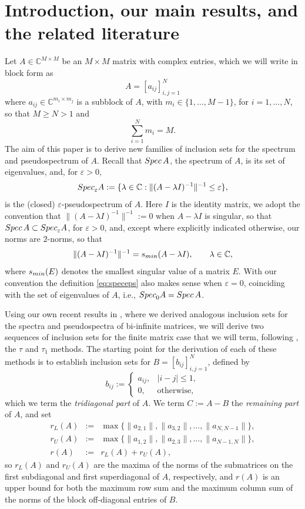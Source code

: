 \documentclass[preprint,1p,11pt]{elsarticle}
\newcommand\C{{\mathbb C}}
\newcommand\eps{{\varepsilon}}
\newcommand\Spec{{\rm Spec}\,}  %
\newcommand\Specn{{\rm Spec}}   %
\newcommand\Speps{{\rm Spec}_\eps}
\numberwithin{equation}{section}   %
\numberwithin{figure}{section}  %
\begin{document}
\section{Introduction, our main results, and the related literature} \label{sec:intro}
Let $A\in \C^{M\times M}$ be an $M\times M$ matrix with complex entries, which we will write in block form as
\begin{equation} \label{eq:block}
A = [a_{ij}]_{i,j=1}^N
\end{equation}
where $a_{ij}\in \C^{m_i \times m_j}$ is a subblock of $A$, with $m_i\in \{1,\ldots,M-1\}$, for $i=1,\ldots,N$, so that $M\geq N>1$ and
$$
\sum_{i=1}^N m_i = M. 
$$ 
The aim of this paper is to derive new families of inclusion sets for the spectrum and pseudospectrum of $A$. Recall that $\Spec A$, the spectrum of $A$, is its set of eigenvalues, and, for $\eps>0$, 
\begin{equation} \label{eq:speceps}
\Speps A := \{\lambda\in \C: \|(A-\lambda I)^{-1}\|^{-1}\leq \eps\}, 
\end{equation}
is the (closed) $\eps$-pseudospectrum of $A$. Here $I$ is the identity matrix, we adopt the convention that $\|(A-\lambda I)^{-1}\|^{-1}:= 0$ when $A-\lambda I$ is singular, so that $\Spec A \subset \Speps A$, for $\eps>0$, and, except where explicitly indicated otherwise, our norms are $2$-norms, so that 
$$
\|(A-\lambda I)^{-1}\|^{-1} = s_{\rm min}(A-\lambda I), \qquad \lambda \in \C,
$$
where $s_{\rm min}(E)$ denotes the smallest singular value of a matrix $E$. With our convention the definition \eqref{eq:speceps} also makes sense when $\eps=0$, coinciding with the set of eigenvalues of $A$, i.e., $\Specn_0 A = \Spec A$.  

Using our own recent results in \cite{CW.Heng.ML:SpecIncl1}, where we derived analogous inclusion sets for the spectra and pseudospectra of bi-infinite matrices, we will derive two sequences of inclusion sets for the finite matrix case that we will term, following \cite{CW.Heng.ML:SpecIncl1}, the $\tau$ and $\tau_1$ methods. The starting point for the derivation of each of these methods is to establish inclusion sets for $B=[b_{ij}]_{i,j=1}^N$, defined by
$$
b_{ij} := \left\{\begin{array}{ll} a_{ij}, & |i-j|\leq 1,\\ 0, & \mbox{otherwise},\end{array}\right.
$$ 
which we term the {\it tridiagonal part} of $A$. We term $C:=A-B$ the {\em remaining part} of $A$, and set
\begin{eqnarray} \nonumber
r_L(A) &:=& \max\{\|a_{2,1}\|,\|a_{3,2}\|,\ldots,\|a_{N,N-1}\|\},\\ \label{eq:rdef}
 r_U(A)& :=& \max\{\|a_{1,2}\|,\|a_{2,3}\|,\ldots,\|a_{N-1,N}\|\},\\ \nonumber
r(A) &:=& r_L(A)+r_U(A),
\end{eqnarray}
so $r_L(A)$ and $r_U(A)$ are the maxima of the norms of the submatrices on the first subdiagonal and first superdiagonal of $A$, respectively, and $r(A)$ is an upper bound for both the maximum row sum and the maximum column sum of the norms of the block off-diagonal entries of $B$.
\end{document}
